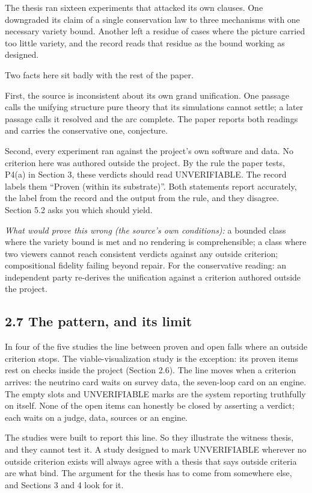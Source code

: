 \documentclass[11pt]{article}
\begin{document}
The thesis ran sixteen experiments that attacked its own clauses. One downgraded its claim of a single conservation law to three mechanisms with one necessary variety bound. Another left a residue of cases where the picture carried too little variety, and the record reads that residue as the bound working as designed.

Two facts here sit badly with the rest of the paper.

First, the source is inconsistent about its own grand unification. One passage calls the unifying structure pure theory that its simulations cannot settle; a later passage calls it resolved and the arc complete. The paper reports both readings and carries the conservative one, conjecture.

Second, every experiment ran against the project's own software and data. No criterion here was authored outside the project. By the rule the paper tests, P4(a) in Section 3, these verdicts should read UNVERIFIABLE. The record labels them ``Proven (within its substrate)''. Both statements report accurately, the label from the record and the output from the rule, and they disagree. Section 5.2 asks you which should yield.

\emph{What would prove this wrong (the source's own conditions):} a bounded class where the variety bound is met and no rendering is comprehensible; a class where two viewers cannot reach consistent verdicts against any outside criterion; compositional fidelity failing beyond repair. For the conservative reading: an independent party re-derives the unification against a criterion authored outside the project.

\subsection*{2.7 The pattern, and its limit}

In four of the five studies the line between proven and open falls where an outside criterion stops. The viable-visualization study is the exception: its proven items rest on checks inside the project (Section 2.6). The line moves when a criterion arrives: the neutrino card waits on survey data, the seven-loop card on an engine. The empty slots and UNVERIFIABLE marks are the system reporting truthfully on itself. None of the open items can honestly be closed by asserting a verdict; each waits on a judge, data, sources or an engine.

The studies were built to report this line. So they illustrate the witness thesis, and they cannot test it. A study designed to mark UNVERIFIABLE wherever no outside criterion exists will always agree with a thesis that says outside criteria are what bind. The argument for the thesis has to come from somewhere else, and Sections 3 and 4 look for it.
\end{document}
